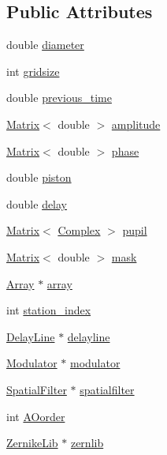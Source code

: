 \subsection*{Public Attributes}
\begin{DoxyCompactItemize}
\item 
double \hyperlink{classBeam_a5b8823412936aee5a88bc657e0ed546c}{diameter}
\item 
int \hyperlink{classBeam_a1c813015bb33a0565e1ee3ea0d570e11}{gridsize}
\item 
double \hyperlink{classBeam_ac1e58da3860afeb2d8d6e1daf7022cca}{previous\_\-time}
\item 
\hyperlink{classMatrix}{Matrix}$<$ double $>$ \hyperlink{classBeam_ac83b6ebc1b9d745461ba630555636109}{amplitude}
\item 
\hyperlink{classMatrix}{Matrix}$<$ double $>$ \hyperlink{classBeam_aa2ed8956a6aca9da62da12bcb8cebb7b}{phase}
\item 
double \hyperlink{classBeam_a342991126e87a3a2aa89d04ff7b2fd0a}{piston}
\item 
double \hyperlink{classBeam_affa1c91c24f15b6acbaae1682b19d9a7}{delay}
\item 
\hyperlink{classMatrix}{Matrix}$<$ \hyperlink{Matrix_8h_a37333e1628babc1863d6963489e5e9ea}{Complex} $>$ \hyperlink{classBeam_a3b248c45a5630e6e0761b1f2d16350fc}{pupil}
\item 
\hyperlink{classMatrix}{Matrix}$<$ double $>$ \hyperlink{classBeam_af1dc67711c28c260a813088d4afb14e9}{mask}
\item 
\hyperlink{classArray}{Array} $\ast$ \hyperlink{classBeam_abb5a7f1e41ea63a0e693f6e29e11e16c}{array}
\item 
int \hyperlink{classBeam_ae589b08d6d0d638c18a15880efc521d2}{station\_\-index}
\item 
\hyperlink{classDelayLine}{DelayLine} $\ast$ \hyperlink{classBeam_abb779dd249b5a26502a49106aa8023a4}{delayline}
\item 
\hyperlink{classModulator}{Modulator} $\ast$ \hyperlink{classBeam_a1ef612af4b85d2e5866d40eec618efcb}{modulator}
\item 
\hyperlink{classSpatialFilter}{SpatialFilter} $\ast$ \hyperlink{classBeam_a68bc1a7abd201297114cd53af925f83f}{spatialfilter}
\item 
int \hyperlink{classBeam_a2de78a8bf91493e5c0cf0544613d0289}{AOorder}
\item 
\hyperlink{classZernikeLib}{ZernikeLib} $\ast$ \hyperlink{classBeam_ad41f9e0d00cfe3ed0e5a22a2f3e7c399}{zernlib}
\end{DoxyCompactItemize}
